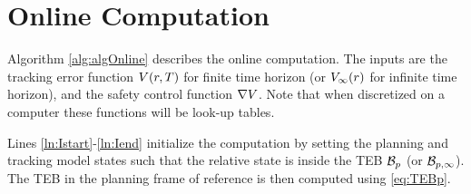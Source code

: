 \section{Online Computation \label{sec:online}}
Algorithm \ref{alg:algOnline} describes the online computation. The inputs are the tracking error function $V(r,T)$ for finite time horizon (or $V_\infty(r)$ for infinite time horizon), and the safety control function $\nabla V$. 
Note that when discretized on a computer these functions will be look-up tables.

Lines \ref{ln:Istart}-\ref{ln:Iend} initialize the computation by setting the planning and tracking model states such that the relative state is inside the TEB $\mathcal B_p$ (or $\mathcal B_{p, \infty}$). 
The TEB in the planning frame of reference is then computed using \eqref{eq:TEBp}. 

